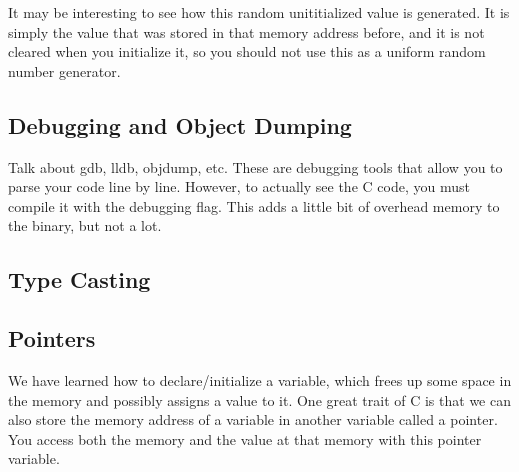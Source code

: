 \documentclass{article}
\newcounter{code}[section]
\begin{document}
  It may be interesting to see how this random unititialized value is generated. It is simply the value that was stored in that memory address before, and it is not cleared when you initialize it, so you should not use this as a uniform random number generator. 


  \subsection{Debugging and Object Dumping} 

    Talk about gdb, lldb, objdump, etc. These are debugging tools that allow you to parse your code line by line. However, to actually see the C code, you must compile it with the debugging flag. This adds a little bit of overhead memory to the binary, but not a lot. 

  \subsection{Type Casting}


  \subsection{Pointers}

    We have learned how to declare/initialize a variable, which frees up some space in the memory and possibly assigns a value to it. One great trait of C is that we can also store the memory address of a variable in another variable called a pointer. You access both the memory and the value at that memory with this pointer variable. 
\end{document}
